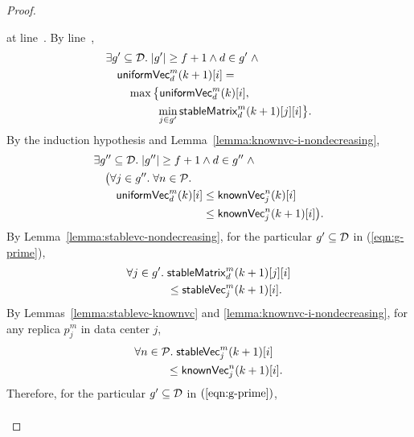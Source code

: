 \begin{proof}
\begin{itemize}
\begin{itemize}
          at line~\code{\ref{alg:unistore-clock}}{\ref{line:stablevc-uniformvc}}.
          By line~\code{\ref{alg:unistore-clock}}{\ref{line:stablevc-g}},
          \begin{align}
            &\exists g' \subseteq \mathcal{D}.\; |g'| \ge f + 1 \land d \in g'\; \land
              \label{eqn:g-prime} \\
              &\quad {\sf uniformVec}^{m}_{d}(k+1)[i] = \nonumber \\
                &\qquad \max\big\{{\sf uniformVec}^{m}_{d}(k)[i], \nonumber \\
                  &\qquad\qquad\;\; \min_{j \in g'} {\sf stableMatrix}^{m}_{d}(k+1)[j][i]\big\}. \nonumber
          \end{align}
          By the induction hypothesis and Lemma~\ref{lemma:knownvc-i-nondecreasing},
          \begin{align}
            &\exists g'' \subseteq \D.\; |g''| \ge f + 1 \land d \in g''\; \land
              \label{eqn:g-prime-prime} \\
              &\quad \big(\forall j \in g''.\; \forall n \in \P. \nonumber \\
                &\qquad \uniformVC^{m}_{d}(k)[i] \le \knownVC^{n}_{j}(k)[i] \nonumber \\
                &\phantom{\qquad \uniformVC^{m}_{d}(k)[i] }
                  \le \knownVC^{n}_{j}(k+1)[i]\big). \nonumber
          \end{align}
          By Lemma~\ref{lemma:stablevc-nondecreasing},
          for the particular $g' \subseteq \mathcal{D}$ in (\ref{eqn:g-prime}),
          \begin{align}
            \forall j \in g'.\; &{\sf stableMatrix}^{m}_{d}(k+1)[j][i]
              \label{eqn:stablematrix-j-i} \\
              &\le {\sf stableVec}^{m}_{j}(k+1)[i].
              \nonumber
          \end{align}
          By Lemmas~\ref{lemma:stablevc-knownvc} and \ref{lemma:knownvc-i-nondecreasing},
          for any replica $p^{m}_{j}$ in data center $j$,
          \begin{align}
            &\forall n \in \mathcal{P}.\; {\sf stableVec}^{m}_{j}(k+1)[i]
              \label{eqn:stablevc-j-i}\\
              &\qquad\;\;\; \le {\sf knownVec}^{n}_{j}(k+1)[i]. \nonumber
          \end{align}
          Therefore, for the particular $g' \subseteq \mathcal{D}$ in $(\ref{eqn:g-prime})$,
          \begin{align}

\end{align}
\end{itemize}
\end{itemize}
\end{proof}
